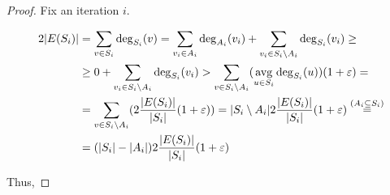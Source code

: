     \begin{proof}
        Fix an iteration $i$.


        \begin{equation*}
            \begin{split}
                2 \vert E(S_i) \vert  &= \sum_{v \in S_i} \deg_{S_i}(v) = \sum_{v_i \in A_i} \deg_{A_i}(v_i) + \sum_{v_i \in S_i \setminus A_i} \deg_{S_i} (v_i) \geq\\
                                        &\geq 0 + \sum_{v_i \in S_i \setminus A_i} \deg_{S_i} (v_i) > \sum_{v \in S_i \setminus A_i}(\operatorname*{avg}_{u \in S_i} \deg_{S_i} (u))(1 + \varepsilon) =\\
                                        &= \sum_{v \in S_i \setminus A_i}(2 \dfrac{\vert E(S_i) \vert}{\vert S_i \vert} (1 + \varepsilon)) = \vert S_i \setminus A_i \vert 2 \dfrac{\vert E(S_i) \vert}{\vert S_i \vert} (1+\varepsilon) \overset{(A_i \subseteq S_i)}{=}\\
                                        &= (\vert S_i \vert - \vert A_i \vert) 2 \dfrac{\vert E(S_i) \vert}{\vert S_i \vert} (1+\varepsilon)
            \end{split}
        \end{equation*}

        Thus,


\end{proof}
